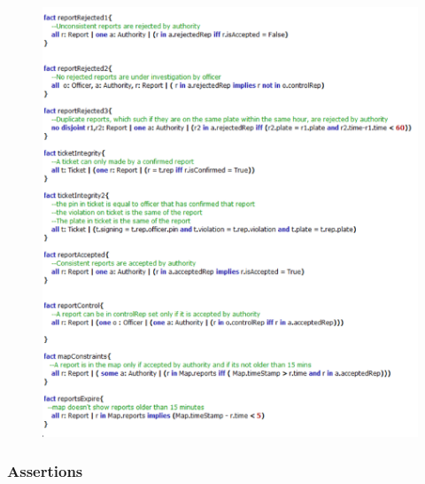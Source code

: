 \documentclass[12pt,a4paper]{article}
\begin{document}
\begin{figure}[H]
				\centering
				\includegraphics[width=.75\paperwidth,height=.75\paperheight, keepaspectratio]{Images/Alloy/facts2}
\end{figure}

\subsubsection{Assertions}
\end{document}
